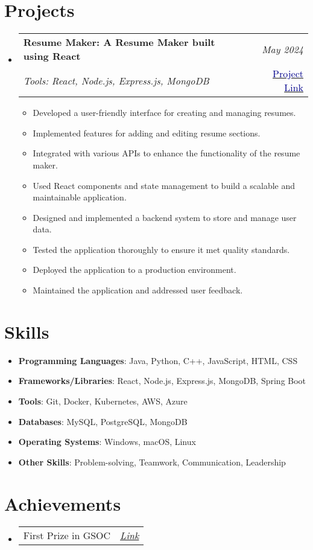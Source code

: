 \documentclass[a4paper,11pt]{article}
\makeatletter
\newcommand{\resumeItem}[2]{
  \item{
    \textbf{#1}{\hspace{0.5mm}#2 \vspace{-0.5mm}}
  }
}
\newcommand{\resumePOR}[3]{
\vspace{0.5mm}\item
    \begin{tabular*}{0.97\textwidth}[t]{l@{\extracolsep{\fill}}r}
        \textbf{#1}\hspace{0.3mm}#2 & \textit{\small{#3}} 
    \end{tabular*}
    \vspace{-2mm}
}
\newcommand{\resumeProject}[4]{
\vspace{0.5mm}\item
    \begin{tabular*}{0.98\textwidth}[t]{l@{\extracolsep{\fill}}r}
        \textbf{#1} & \textit{\footnotesize{#3}} \\
        \footnotesize{\textit{#2}} & \footnotesize{#4}
    \end{tabular*}
    \vspace{-2.4mm}
}
\newcommand{\resumeSubItem}[2]{\resumeItem{#1}{#2}\vspace{-4pt}}
\newcommand{\resumeSubHeadingListStart}{\begin{itemize}[leftmargin=*,labelsep=1mm]}
\newcommand{\resumeHeadingSkillStart}{\begin{itemize}[leftmargin=*,itemsep=1.7mm, rightmargin=2ex]}
\newcommand{\resumeItemListStart}{\begin{itemize}[leftmargin=*,labelsep=1mm,itemsep=0.5mm]}
\newcommand{\resumeSubHeadingListEnd}{\end{itemize}\vspace{2mm}}
\newcommand{\resumeHeadingSkillEnd}{\end{itemize}\vspace{-2mm}}
\newcommand{\resumeItemListEnd}{\end{itemize}\vspace{-2mm}}
\makeatother
\begin{document}
\section{Projects}
\vspace{-0.4mm}
\resumeSubHeadingListStart
\resumeProject
    {Resume Maker: A Resume Maker built using React}
    {Tools: React, Node.js, Express.js, MongoDB}
    {May 2024}
    {{}\href{https://resumemaker.com}{\textcolor{darkblue}{Project Link}}}
\resumeItemListStart
    \item Developed a user-friendly interface for creating and managing resumes.\item Implemented features for adding and editing resume sections.\item Integrated with various APIs to enhance the functionality of the resume maker.\item Used React components and state management to build a scalable and maintainable application.\item Designed and implemented a backend system to store and manage user data.\item Tested the application thoroughly to ensure it met quality standards.\item Deployed the application to a production environment.\item Maintained the application and addressed user feedback.
\resumeItemListEnd
\resumeSubHeadingListEnd
\vspace{-8mm}



    \section{Skills}
\vspace{-0.4mm}
\resumeHeadingSkillStart
\resumeSubItem{Programming Languages}{: Java, Python, C++, JavaScript, HTML, CSS}\resumeSubItem{Frameworks/Libraries}{: React, Node.js, Express.js, MongoDB, Spring Boot}\resumeSubItem{Tools}{: Git, Docker, Kubernetes, AWS, Azure}\resumeSubItem{Databases}{: MySQL, PostgreSQL, MongoDB}\resumeSubItem{Operating Systems}{: Windows, macOS, Linux}\resumeSubItem{Other Skills}{: Problem-solving, Teamwork, Communication, Leadership}
\resumeHeadingSkillEnd
\vspace{-2mm}
  





\section{Achievements} 
\vspace{-0.2mm}
\resumeSubHeadingListStart
  
      \resumePOR{}{First Prize in GSOC}
      {\href{https://gsocevent.com}{Link}}
      
\resumeSubHeadingListEnd
\vspace{-6mm}



    
\end{document}
